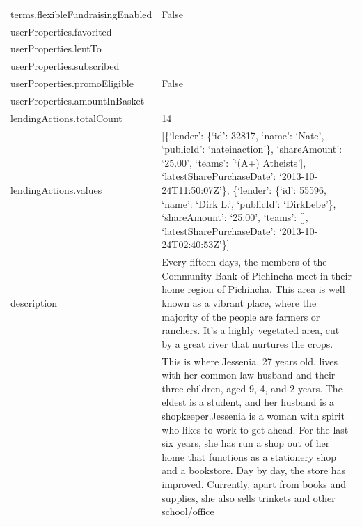 \begin{longtable}{|p{}|p{}|}
    terms.flexibleFundraisingEnabled     & False                                                               \\
    userProperties.favorited             &                                                                     \\
    userProperties.lentTo                &                                                                     \\
    userProperties.subscribed            &                                                                     \\
    userProperties.promoEligible         & False                                                               \\
    userProperties.amountInBasket        &                                                                     \\
    lendingActions.totalCount            & 14                                                                  \\
    lendingActions.values                & {[}\{`lender': \{`id': 32817, `name': `Nate',
    `publicId': `nateinaction'\}, `shareAmount': `25.00', `teams': {[}`(A+)
    Atheists'{]}, `latestSharePurchaseDate': `2013-10-24T11:50:07Z'\},
    \{`lender': \{`id': 55596, `name': `Dirk L.', `publicId': `DirkLebe'\},
    `shareAmount': `25.00', `teams': {[}{]}, `latestSharePurchaseDate':
    `2013-10-24T02:40:53Z'\}{]}                                                                                \\
    description                          & Every fifteen days, the members of the Community Bank of
    Pichincha meet in their home region of Pichincha. This area is well
    known as a vibrant place, where the majority of the people are farmers
    or ranchers. It's a highly vegetated area, cut by a great river that
    nurtures the crops.                                                                                        \\
                                         & This is where Jessenia, 27 years old, lives with her common-law
    husband and their three children, aged 9, 4, and 2 years. The eldest is
    a student, and her husband is a shopkeeper.Jessenia is a woman with
    spirit who likes to work to get ahead. For the last six years, she has
    run a shop out of her home that functions as a stationery shop and a
    bookstore. Day by day, the store has improved. Currently, apart from
    books and supplies, she also sells trinkets and other school/office

\end{longtable}
